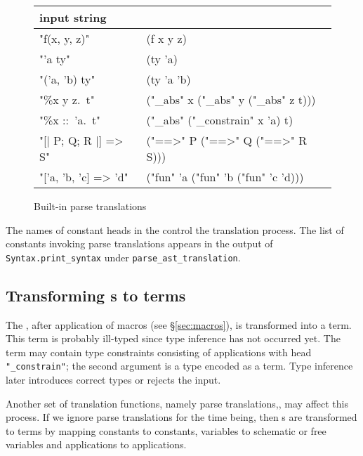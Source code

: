 \begin{figure}
\begin{center}
\tt\begin{tabular}{ll}
\rm input string            & \rm \AST{} \\\hline
"f(x, y, z)"                & (f x y z) \\
"'a ty"                     & (ty 'a) \\
"('a, 'b) ty"               & (ty 'a 'b) \\
"\%x y z.\ t"               & ("_abs" x ("_abs" y ("_abs" z t))) \\
"\%x ::\ 'a.\ t"            & ("_abs" ("_constrain" x 'a) t) \\
"[| P; Q; R |] => S"        & ("==>" P ("==>" Q ("==>" R S))) \\
"['a, 'b, 'c] => 'd"        & ("fun" 'a ("fun" 'b ("fun" 'c 'd)))
\end{tabular}
\end{center}
\caption{Built-in parse \AST{} translations}\label{fig:parse_ast_tr}
\end{figure}

The names of constant heads in the \AST{} control the translation process.
The list of constants invoking parse \AST{} translations appears in the
output of {\tt Syntax.print_syntax} under {\tt parse_ast_translation}.


\subsection{Transforming \AST{}s to terms}
The \AST{}, after application of macros (see \S\ref{sec:macros}), is
transformed into a term.  This term is probably ill-typed since type
inference has not occurred yet.  The term may contain type constraints
consisting of applications with head {\tt "_constrain"}; the second
argument is a type encoded as a term.  Type inference later introduces
correct types or rejects the input.

Another set of translation functions, namely parse
translations,, may affect this process.  If we
ignore parse translations for the time being, then \AST{}s are transformed
to terms by mapping \AST{} constants to constants, \AST{} variables to
schematic or free variables and \AST{} applications to applications.

